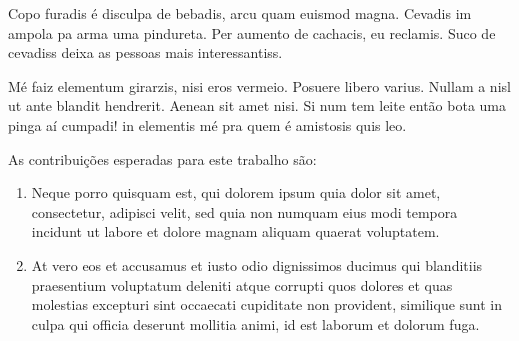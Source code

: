 Copo furadis é disculpa de bebadis, arcu quam euismod magna. Cevadis im ampola pa arma uma pindureta. Per aumento de cachacis, eu reclamis. Suco de cevadiss deixa as pessoas mais interessantiss.

Mé faiz elementum girarzis, nisi eros vermeio. Posuere libero varius. Nullam a nisl ut ante blandit hendrerit. Aenean sit amet nisi. Si num tem leite então bota uma pinga aí cumpadi! in elementis mé pra quem é amistosis quis leo. 

As contribui\c{c}\~{o}es esperadas para este trabalho s\~{a}o:

\begin{enumerate}[label=(\roman*)]
\item Neque porro quisquam est, qui dolorem ipsum quia dolor sit amet, consectetur, adipisci velit, sed quia non numquam eius modi tempora incidunt ut labore et dolore magnam aliquam quaerat voluptatem.

\item At vero eos et accusamus et iusto odio dignissimos ducimus qui blanditiis praesentium voluptatum deleniti atque corrupti quos dolores et quas molestias excepturi sint occaecati cupiditate non provident, similique sunt in culpa qui officia deserunt mollitia animi, id est laborum et dolorum fuga.
\end{enumerate}


